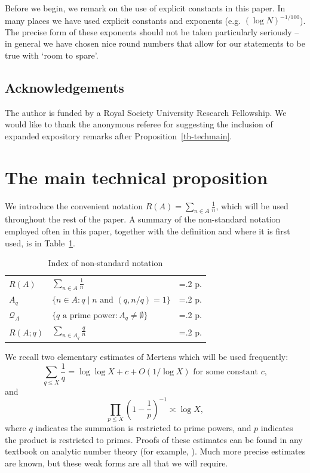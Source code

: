 \documentclass{amsart}
\newcommand{\brac}[1]{\left( #1\right)}
\begin{document}
Before we begin, we remark on the use of explicit constants in this paper. In many places we have used explicit constants and exponents (e.g. $(\log N)^{-1/100}$). The precise form of these exponents should not be taken particularly seriously -- in general we have chosen nice round numbers that allow for our statements to be true with `room to spare'.

\subsection*{Acknowledgements}
The author is funded by a Royal Society University Research Fellowship. We would like to thank the anonymous referee for suggesting the inclusion of expanded expository remarks after Proposition~\ref{th-techmain}. 

\section{The main technical proposition}\label{sec2}
We introduce the convenient notation $R(A)=\sum_{n\in A}\frac{1}{n}$\label{def-ra}, which will be used throughout the rest of the paper. A summary of the non-standard notation employed often in this paper, together with the definition and where it is first used, is in Table~\ref{tab-not}.

\renewcommand{\arraystretch}{1.5}
\begin{table}[h!]
\centering
\caption{Index of non-standard notation}
\label{tab-not}
\begin{tabularx}{1\textwidth} {
| >{\centering\arraybackslash\hsize=1\hsize}X | >{\centering\arraybackslash\hsize1.8\hsize}X | >{\centering\arraybackslash\hsize=.2\hsize}X |
}
 \hline
 $R(A)$ & $\sum_{n\in A}\frac{1}{n}$ & p.\pageref{def-ra}\\
 $A_q$ & $\{ n\in A: q\mid n\textrm{ and }(q,n/q)=1\}$ & p.\pageref{def-aq}\\
 $\mathcal{Q}_A$ & $\{ q\textrm{ a prime power}: A_q\neq \emptyset\}$ & p.\pageref{def-qa}\\
 $R(A;q)$ & $\sum_{n\in A_q}\frac{q}{n}$ & p.\pageref{def-raq}\\
 \hline
\end{tabularx}

\end{table}


 We recall two elementary estimates of Mertens which will be used frequently:
\begin{equation}\label{mertens1}
\sum_{q\leq X}\frac{1}{q}= \log\log X+c+O(1/\log X)\textrm{ for some constant }c,
\end{equation}
and
\begin{equation}\label{mertens2}
\prod_{p\leq X}\brac{1-\frac{1}{p}}^{-1}\asymp \log X,
\end{equation}
where $q$ indicates the summation is restricted to prime powers, and $p$ indicates the product is restricted to primes. Proofs of these estimates can be found in any textbook on analytic number theory (for example, \cite[Chapter 2]{MV}). Much more precise estimates are known, but these weak forms are all that we will require.
\end{document}
